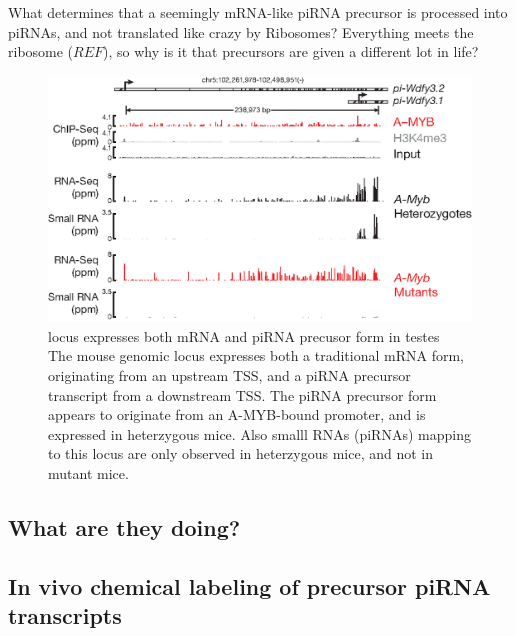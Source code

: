     What determines that a seemingly mRNA-like piRNA precursor is processed into piRNAs, and not translated like crazy by Ribosomes?  Everything meets the ribosome ($REF$), so why is it that precursors are given a different lot in life?

    \begin{figure} %
      \centering 
      \includegraphics{Figures/Discussion/pi-wdfy3.eps}
      \caption[\wdfy{} locus expresses both mRNA and piRNA precusor form in testes]
      {\wdfy{} locus expresses both mRNA and piRNA precusor form in testes\\[0.25cm]
        The mouse genomic locus \wdfy{} expresses both a traditional mRNA form, originating from an upstream TSS, and a piRNA precursor transcript from a downstream TSS. The piRNA precursor form appears to originate from an A-MYB-bound promoter, and is expressed in \amyb{} heterzygous mice. Also smalll RNAs (piRNAs) mapping to this locus are only observed in \amyb{} heterzygous mice, and not in \amyb{} mutant mice.
        }
      \label{Disc:fig:wdfy3}
      \end{figure}


  \subsection{What are they doing?}\label{Disc:subsec:What are piRNAs doing}


  \subsection{In vivo chemical labeling of precursor piRNA transcripts}\label{Disc:subsec:Labeling of precursors}

